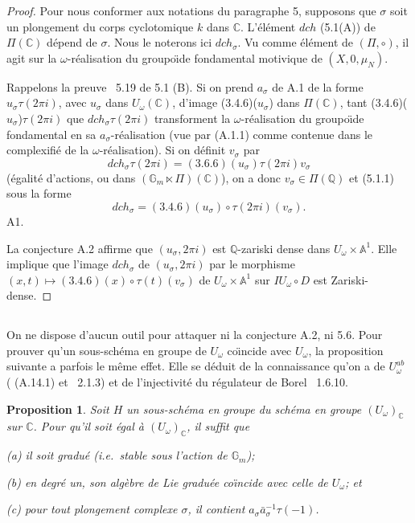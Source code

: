 \documentclass[11pt,a4paper]{article}
\theoremstyle{plain}
\newtheorem{proposition}[theorem]{Proposition}
\theoremstyle{definition}
\newcommand{\dch}{\mathit{dch}}
\newcommand{\Gm}{\mathbb{G}_m}
\newcommand{\Q}{\mathbb{Q}}
\newcommand{\C}{\mathbb{C}}
\newcommand{\A}{\mathbb{A}}
\begin{document}
\begin{proof}
Pour nous conformer aux notations du paragraphe 5, supposons que $\sigma$ soit un plongement du corps cyclotomique $k$ dans $\C$. L'\'el\'ement $\dch$ (5.1(A)) de $\Pi(\C)$ d\'epend de $\sigma$. Nous le noterons ici $\dch_\sigma$. Vu comme \'el\'ement de $(\Pi, \circ)$, il agit sur la $\omega$-r\'ealisation du groupo\"{\i}de fondamental motivique de $(X, 0, \mu_N)$.

Rappelons la preuve \cite{1}~5.19 de 5.1 (B). Si on prend $a_\sigma$ de A.1 de la forme $u_\sigma \tau(2\pi i)$, avec $u_\sigma$ dans $U_\omega(\C)$, d'image (3.4.6)($u_\sigma$) dans $\Pi(\C)$, tant (3.4.6)($u_\sigma$)$\tau(2\pi i)$ que $\dch_\sigma \tau(2\pi i)$ transforment la $\omega$-r\'ealisation du groupo\"{\i}de fondamental en sa $a_\sigma$-r\'ealisation (vue par (A.1.1) comme contenue dans le complexifi\'e de la $\omega$-r\'ealisation). Si on d\'efinit $v_\sigma$ par
\[
\dch_\sigma \tau(2\pi i) = (3.6.6)(u_\sigma) \tau(2\pi i) v_\sigma
\]
(\'egalit\'e d'actions, ou dans $(\Gm \ltimes \Pi)(\C)$), on a donc $v_\sigma \in \Pi(\Q)$ et (5.1.1) sous la forme
\begin{equation}\label{eq:A.3.1}
\dch_\sigma = (3.4.6)(u_\sigma) \circ \tau(2\pi i)(v_\sigma).
\end{equation}
A1.

La conjecture A.2 affirme que $(u_\sigma, 2\pi i)$ est $\Q$-zariski dense dans $U_\omega \times \A^1$. Elle implique que l'image $\dch_\sigma$ de $(u_\sigma, 2\pi i)$ par le morphisme $(x,t) \mapsto (3.4.6)(x) \circ \tau(t)(v_\sigma)$ de $U_\omega \times \A^1$ sur $IU_\omega \circ D$ est Zariski-dense.
\end{proof}

\subsection{}
On ne dispose d'aucun outil pour attaquer ni la conjecture A.2, ni 5.6. Pour prouver qu'un sous-sch\'ema en groupe de $U_\omega$ co\"{\i}ncide avec $U_\omega$, la proposition suivante a parfois le m\^eme effet. Elle se d\'eduit de la connaissance qu'on a de $U_\omega^{ab}$ (\cite{1} (A.14.1) et \cite{1}~2.1.3) et de l'injectivit\'e du r\'egulateur de Borel \cite{1}~1.6.10.

\begin{proposition}\label{prop:A.4}
Soit $H$ un sous-sch\'ema en groupe du sch\'ema en groupe $(U_\omega)_\C$ sur $\C$. Pour qu'il soit \'egal \`a $(U_\omega)_\C$, il suffit que

\emph{(a)} il soit gradu\'e (i.e.~stable sous l'action de $\Gm$);

\emph{(b)} en degr\'e un, son alg\`ebre de Lie gradu\'ee co\"{\i}ncide avec celle de $U_\omega$; et

\emph{(c)} pour tout plongement complexe $\sigma$, il contient $a_\sigma \bar{a}_\sigma^{-1} \tau(-1)$.
\end{proposition}
\end{document}

